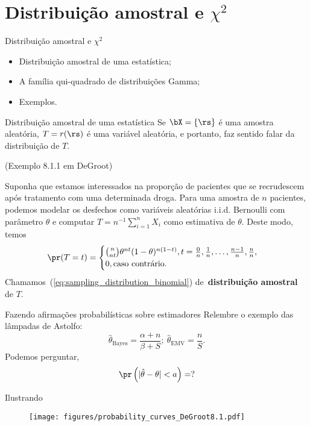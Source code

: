 \section{Distribuição amostral e $\chi^2$}
\begin{frame}{Distribuição amostral e $\chi^2$}
 \begin{itemize}
  \item Distribuição amostral de uma estatística;
  \item A família qui-quadrado de distribuições Gamma;
  \item Exemplos.
 \end{itemize}
\end{frame}
\begin{frame}{Distribuição amostral de uma estatística}
 Se $\bX = \{ \rs \}$ é uma amostra aleatória, $T = r(\rs)$ é uma variável aleatória, e portanto, faz sentido falar da distribuição de $T$.
 \begin{exemplo}
  (Exemplo 8.1.1 em DeGroot)
  
  Suponha que estamos interessados na proporção de pacientes que se recrudescem após tratamento com uma determinada droga.
  Para uma amostra de $n$ pacientes, podemos modelar os desfechos como variáveis aleatórias i.i.d. Bernoulli com parâmetro $\theta$ e computar $T = n^{-1}\sum_{i=1}^n X_i$ como estimativa de $\theta$.
  Deste modo, temos
  \begin{equation}
  \label{eq:sampling_distribution_binomial}
   \pr(T = t) =
    \begin{cases}
    \binom{n}{nt} \theta^{nt} (1-\theta)^{n(1-t)}, t = \frac{0}{n}, \frac{1}{n}, \ldots,\frac{n-1}{n} ,\frac{n}{n},\\
    0,\text{caso contrário}.
    \end{cases}
  \end{equation}
Chamamos~(\ref{eq:sampling_distribution_binomial}) de~\textbf{distribuição amostral} de $T$.
 \end{exemplo}
\end{frame}

\begin{frame}{Fazendo afirmações probabilísticas sobre estimadores}
 Relembre o exemplo das lâmpadas de Astolfo:
 \[ \hat{\theta}_{\text{Bayes}} = \frac{\alpha + n}{\beta + S}; \: \hat{\theta}_{\text{EMV}} = \frac{n}{S}. \]
 Podemos perguntar, 
 \[ \pr\left(|\hat{\theta} -\theta| < a\right) = ? \]
\end{frame}

\begin{frame}{Ilustrando}
 \begin{figure}
  \texttt{[image: figures/probability\_curves\_DeGroot8.1.pdf]}
 \end{figure}
\end{frame}

